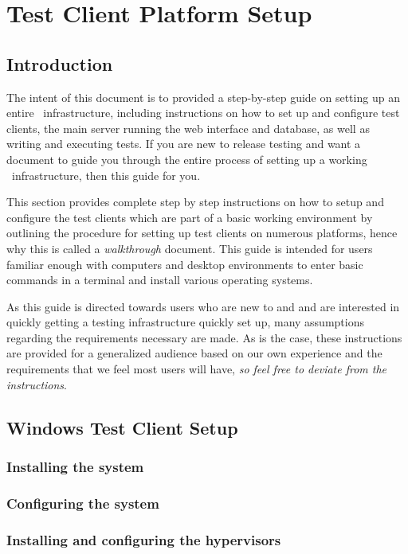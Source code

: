 \chapter{\cernvmreleasetesting Test Client Platform Setup}
\label{sec:testclientsetup}

\section{Introduction}
The intent of this document is to provided a step-by-step guide on setting up an entire \cernvmreleasetesting\ infrastructure, including instructions
on how to set up and configure test clients, the main server running the web interface and database, as well as writing and executing tests. If you are
new to release testing and want a document to guide you through the entire process of setting up a working \cernvmreleasetesting\ infrastructure,
then this guide for you.

This section provides complete step by step instructions on how to setup and configure the test clients which are part of a basic working
\releasetesting environment by outlining the procedure for setting up test clients on numerous platforms, hence why this is called a 
\emph{walkthrough} document. This guide is intended for users familiar enough with computers and desktop environments to enter basic commands
in a terminal and install various operating systems. 

As this guide is directed towards users who are new to \cernvmreleasetesting and \tapper and
are interested in quickly getting a \cernvm testing infrastructure quickly set up, many assumptions regarding the requirements necessary are made.
As is the case, these instructions are provided for a generalized audience based on our own experience and the requirements that we feel most users
will have, \emph{so feel free to deviate from the instructions}. 

\section{Windows Test Client Setup}
\subsection{Installing the system}
\subsection{Configuring the system}
\subsection{Installing and configuring the hypervisors}
